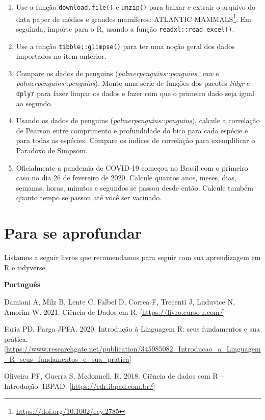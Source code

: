 \documentclass[
]{book}
\renewcommand{\href}[2]{#2\footnote{\url{#1}}}
\begin{document}
\begin{enumerate}
\def\labelenumi{\arabic{enumi}.}
\setcounter{enumi}{1}
\item
  Use a função \texttt{download.file()} e \texttt{unzip()} para baixar e extrair o arquivo do data paper de médios e grandes mamíferos: \href{https://doi.org/10.1002/ecy.2785}{ATLANTIC MAMMALS}. Em seguinda, importe para o R, usando a função \texttt{readxl::read\_excel()}.
\item
  Use a função \texttt{tibble::glimpse()} para ter uma noção geral dos dados importados no item anterior.
\item
  Compare os dados de penguins (\emph{palmerpenguins::penguins\_raw} e \emph{palmerpenguins::penguins}). Monte uma série de funções dos pacotes \emph{tidyr} e \texttt{dplyr} para fazer limpar os dados e fazer com que o primeiro dado seja igual ao segundo.
\item
  Usando os dados de penguins (\emph{palmerpenguins::penguins}), calcule a correlação de Pearson entre comprimento e profundidade do bico para cada espécie e para todas as espécies. Compare os índices de correlação para exemplificar o Paradoxo de Simpsom.
\item
  Oficialmente a pandemia de COVID-19 começou no Brasil com o primeiro caso no dia 26 de fevereiro de 2020. Calcule quantos anos, meses, dias, semanas, horas, minutos e segundos se passou desde então. Calcule também quanto tempo se passou até você ser vacinado.
\end{enumerate}

\hypertarget{para-se-aprofundar-1}{%
\section{Para se aprofundar}\label{para-se-aprofundar-1}}

Listamos a seguir livros que recomendamos para seguir com sua aprendizagem em R e tidyverse.

\textbf{Português}

Damiani A, Milz B, Lente C, Falbel D, Correa F, Trecenti J, Luduvice N, Amorim W. 2021. Ciência de Dados em R. {[}\url{https://livro.curso-r.com/}{]}

Faria PD, Parga JPFA. 2020. Introdução à Linguagem R: seus fundamentos e sua prática. {[}\url{https://www.researchgate.net/publication/345985082_Introducao_a_Linguagem_R_seus_fundamentos_e_sua_pratica}{]}

Oliveira PF, Guerra S, Mcdonnell, R. 2018. Ciência de dados com R -- Introdução. IBPAD. {[}\url{https://cdr.ibpad.com.br/}{]}
\end{document}
